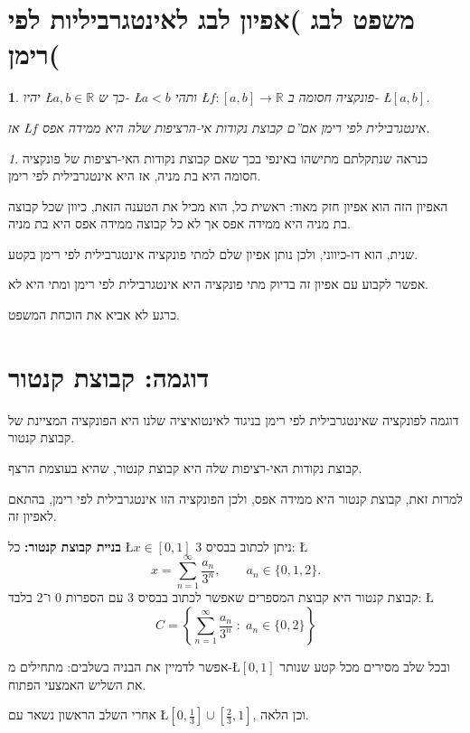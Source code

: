 \documentclass[english,hebrew]{article}
\theoremstyle{remark}
\newtheorem*{rem*}{\protect\remarkname}
\theoremstyle{definition}
\theoremstyle{plain}
\theoremstyle{remark}
\theoremstyle{plain}
\theoremstyle{plain}
\newtheorem*{thm*}{\protect\theoremname}
\providecommand{\remarkname}{הערה}
\providecommand{\theoremname}{משפט}
\begin{document}
\section{משפט לבג )אפיון לבג לאינטגרביליות לפי רימן(}
\begin{thm*}
יהיו \L{$a,b\in\mathbb{R}$} כך ש- \L{$a<b$} ותהי \L{$f:[a,b]\rightarrow\mathbb{R}$}
פונקציה חסומה ב- \L{$[a,b]$}.

אז \L{$f$} אינטגרבילית לפי רימן אם\textquotedblright ם קבוצת נקודות
אי-הרציפות שלה היא ממידה אפס.
\end{thm*}
\begin{rem*}
כנראה שנתקלתם מתישהו באינפי {\endL} בכך שאם קבוצת נקודות
האי-רציפות של פונקציה חסומה היא בת מניה, אז היא אינטגרבילית לפי רימן.

האפיון הזה הוא אפיון חזק מאוד: ראשית כל, הוא מכיל את הטענה הזאת, כיוון
שכל קבוצה בת מניה היא ממידה אפס אך לא כל קבוצה ממידה אפס היא בת מניה.

שנית, הוא דו-כיווני, ולכן נותן אפיון שלם למתי פונקציה אינטגרבילית
לפי רימן בקטע.

אפשר לקבוע עם אפיון זה בדיוק מתי פונקציה היא אינטגרבילית לפי רימן
ומתי היא לא.

כרגע לא אביא את הוכחת המשפט.
\end{rem*}

\section{דוגמה: קבוצת קנטור}

דוגמה לפונקציה שאינטגרבילית לפי רימן בניגוד לאינטואיציה שלנו היא הפונקציה
המציינת של קבוצת קנטור.

קבוצת נקודות האי-רציפות שלה היא קבוצת קנטור, שהיא בעוצמת הרצף.

למרות זאת, קבוצת קנטור היא ממידה אפס, ולכן הפונקציה הזו אינטגרבילית
לפי רימן, בהתאם לאפיון זה.

\textbf{בניית קבוצת קנטור:} כל \L{$x\in[0,1]$} ניתן לכתוב בבסיס 3:
\L{%
\[
x=\sum_{n=1}^{\infty}\frac{a_{n}}{3^{n}},\qquad a_{n}\in\{0,1,2\}.
\]
}%
קבוצת קנטור היא קבוצת המספרים שאפשר לכתוב בבסיס 3 עם הספרות 0 ו־2
בלבד: \L{%
\[
C=\left\{ \sum_{n=1}^{\infty}\frac{a_{n}}{3^{n}}\;:\;a_{n}\in\{0,2\}\right\} 
\]
}%

אפשר לדמיין את הבניה בשלבים: מתחילים מ-\L{$\left[0,1\right]$} ובכל
שלב מסירים מכל קטע שנותר את השליש האמצעי הפתוח.

אחרי השלב הראשון נשאר עם \L{$\left[0,\frac{1}{3}\right]\cup\left[\frac{2}{3},1\right]$},
וכן הלאה.
\end{document}
